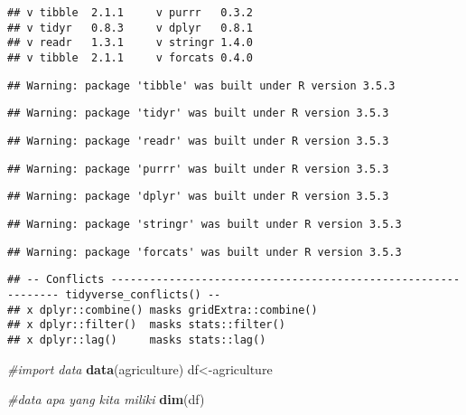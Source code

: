 \documentclass[]{article}
\newenvironment{Shaded}{\begin{snugshade}}{\end{snugshade}}
\newcommand{\CommentTok}[1]{\textcolor[rgb]{0.56,0.35,0.01}{\textit{#1}}}
\newcommand{\KeywordTok}[1]{\textcolor[rgb]{0.13,0.29,0.53}{\textbf{#1}}}
\newcommand{\NormalTok}[1]{#1}
\begin{document}
\begin{verbatim}
## v tibble  2.1.1     v purrr   0.3.2
## v tidyr   0.8.3     v dplyr   0.8.1
## v readr   1.3.1     v stringr 1.4.0
## v tibble  2.1.1     v forcats 0.4.0
\end{verbatim}

\begin{verbatim}
## Warning: package 'tibble' was built under R version 3.5.3
\end{verbatim}

\begin{verbatim}
## Warning: package 'tidyr' was built under R version 3.5.3
\end{verbatim}

\begin{verbatim}
## Warning: package 'readr' was built under R version 3.5.3
\end{verbatim}

\begin{verbatim}
## Warning: package 'purrr' was built under R version 3.5.3
\end{verbatim}

\begin{verbatim}
## Warning: package 'dplyr' was built under R version 3.5.3
\end{verbatim}

\begin{verbatim}
## Warning: package 'stringr' was built under R version 3.5.3
\end{verbatim}

\begin{verbatim}
## Warning: package 'forcats' was built under R version 3.5.3
\end{verbatim}

\begin{verbatim}
## -- Conflicts -------------------------------------------------------------- tidyverse_conflicts() --
## x dplyr::combine() masks gridExtra::combine()
## x dplyr::filter()  masks stats::filter()
## x dplyr::lag()     masks stats::lag()
\end{verbatim}

\begin{Shaded}
\begin{Highlighting}[]
\CommentTok{#import data}
\KeywordTok{data}\NormalTok{(agriculture)}
\NormalTok{df<-agriculture}

\CommentTok{#data apa yang kita miliki}
\KeywordTok{dim}\NormalTok{(df)}
\end{Highlighting}
\end{Shaded}
\end{document}
